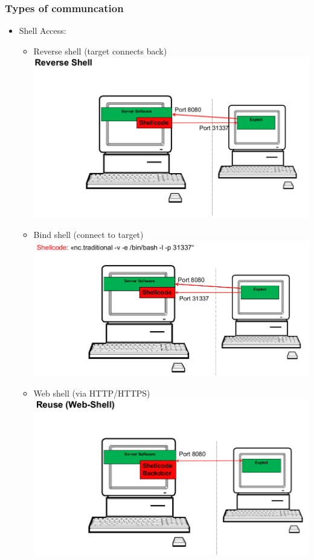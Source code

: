 \subsubsection*{Types of communcation}
\begin{itemize}
\item Shell Access:
  \begin{itemize}
    \tightlist
    \item Reverse shell (target connects back) \\ \includegraphics[scale=0.5]{resources/03-reverse-shell.png}
    \item Bind shell (connect to target) \\ \includegraphics[scale=0.5]{resources/03-bind-shell.png}
    \item Web shell (via HTTP/HTTPS) \\ \includegraphics[scale=0.5]{resources/03-web-shell.png}
  \end{itemize}


\end{itemize}
